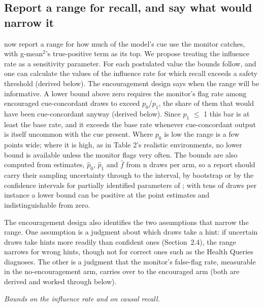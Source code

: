 \documentclass[11pt]{article}
\begin{document}
\subsection{Report a range for recall, and say what would narrow it}
\citet*{guan2026beyond} now report a range for how much of the model’s cue use the monitor catches, with g-mean$^2$’s true-positive term as its top. We propose treating the influence rate as a sensitivity parameter. For each postulated value the bounds follow, and one can calculate the values of the influence rate for which recall exceeds a safety threshold (derived below). The encouragement design says when the range will be informative. A lower bound above zero requires the monitor's flag rate among encouraged cue-concordant draws to exceed $p_0$/$p_1$, the share of them that would have been cue-concordant anyway (derived below). Since $p_1$ $\leq$ 1 this bar is at least the base rate, and it exceeds the base rate whenever cue-concordant output is itself uncommon with the cue present. Where $p_0$ is low the range is a few points wide; where it is high, as in Table 2’s realistic environments, no lower bound is available unless the monitor flags very often. The bounds are also computed from estimates, $\hat{p}_0$, $\hat{p}_1$ and $\hat{f}$ from n draws per arm, so a report should carry their sampling uncertainty through to the interval, by bootstrap or by the confidence intervals for partially identified parameters of \citet{imbens2004confidence}; with tens of draws per instance a lower bound can be positive at the point estimates and indistinguishable from zero.

The encouragement design also identifies the two assumptions that narrow the range. One assumption is a judgment about which draws take a hint: if uncertain draws take hints more readily than confident ones (Section~2.4), the range narrows for wrong hints, though not for correct ones such as the Health Queries diagnoses. The other is a judgment that the monitor’s false-flag rate, measurable in the no-encouragement arm, carries over to the encouraged arm (both are derived and worked through below).

\emph{Bounds on the influence rate and on causal recall.}
\end{document}
